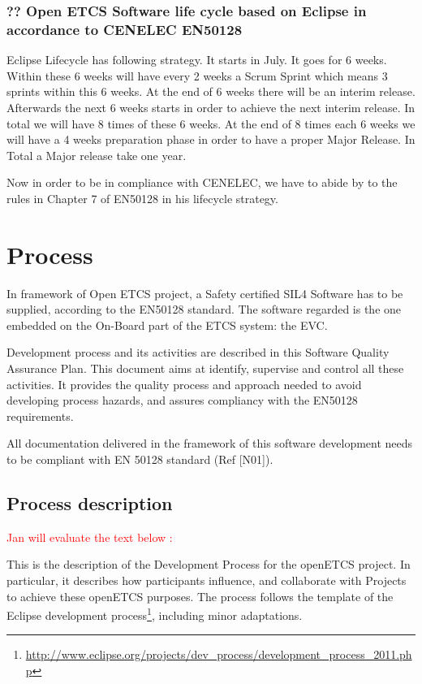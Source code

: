 \documentclass{template/openetcs_article}
\begin{document}
\subsubsection{?? Open ETCS Software life cycle based on Eclipse in accordance to CENELEC EN50128}
Eclipse Lifecycle has following strategy. It starts in July. It goes for 6 weeks. Within these 6 weeks will have every 2 weeks a Scrum Sprint which means 3 sprints within this 6 weeks. At the end of 6 weeks there will be an interim release. Afterwards the next 6 weeks starts in order to achieve the next interim release. In total we will have 8 times of these 6 weeks. At the end of 8 times each 6 weeks we will have a 4 weeks preparation phase in order to have a proper Major Release. In Total a Major release take one year.  

Now in order to be in compliance with CENELEC, we have to abide by to the rules in Chapter 7 of EN50128 in his lifecycle strategy.


\section{Process}
In framework of Open ETCS project, a Safety certified SIL4 Software has to be supplied, according to the EN50128 standard. The software regarded is the one embedded on the On-Board part of the ETCS system: the EVC.

Development process and its activities are described in this Software Quality Assurance Plan. This document aims at identify, supervise and control all these activities. It provides the quality process and approach needed to avoid developing process hazards, and assures compliancy with the EN50128 requirements.

All documentation delivered in the framework of this software development needs to be compliant with EN 50128 standard (Ref [N01]).


\subsection{Process description}
\textcolor{red}{Jan will evaluate the text below :}

This is the description of the Development Process for the openETCS project. In particular, it describes how participants influence, and collaborate with Projects to achieve these openETCS purposes. The process follows the template of the Eclipse development process\footnote{\url{http://www.eclipse.org/projects/dev\_process/development\_process\_2011.php}}, including minor adaptations.
\end{document}
